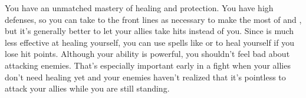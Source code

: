              You have an unmatched mastery of healing and protection.
            You have high defenses, so you can take to the front lines as necessary to make the most of  and , but it's generally better to let your allies take hits instead of you.
            Since  is much less effective at healing yourself, you can use spells like  or  to heal yourself if you lose hit points.
            Although your  ability is powerful, you shouldn't feel bad about attacking enemies.
            That's especially important early in a fight when your allies don't need healing yet and your enemies haven't realized that it's pointless to attack your allies while you are still standing.

